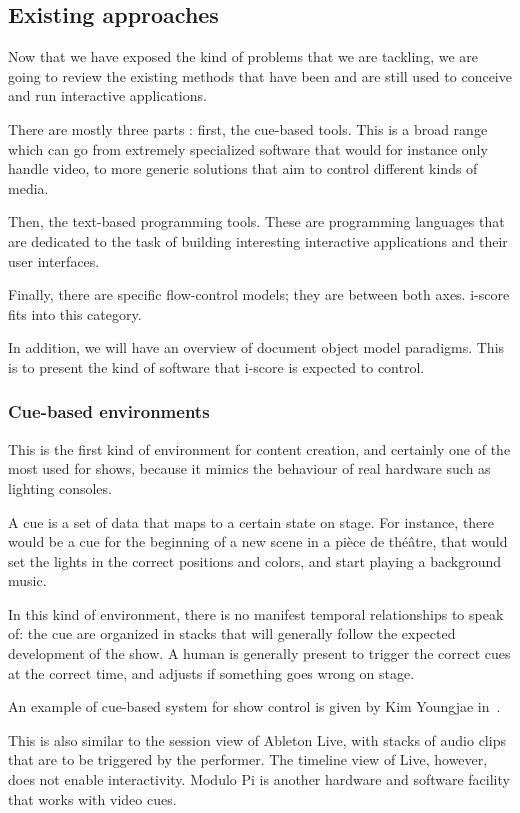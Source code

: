 \documentclass{sigchi}
\begin{document}
\subsection{Existing approaches}
Now that we have exposed the kind of problems that we are tackling, we are going to review the existing methods that have been and are still used to conceive and run interactive applications.

There are mostly three parts : first, the cue-based tools. This is a broad range which can go from extremely specialized software that would for instance only handle video, to more generic solutions that aim to control different kinds of media.

Then, the text-based programming tools. These are programming languages that are dedicated to the task of building interesting interactive applications and their user interfaces.

Finally, there are specific flow-control models; they are between both axes. i-score fits into this category.

In addition, we will have an overview of document object model paradigms. This is to present the kind of software that i-score is expected to control. %

\subsubsection{Cue-based environments}
This is the first kind of environment for content creation, and certainly one of the most used for shows, because it mimics the behaviour of real hardware such as lighting consoles.

A cue is a set of data that maps to a certain state on stage. For instance, there would be a cue for the beginning of a new scene in a pièce de théâtre, that would set the lights in the correct positions and colors, and start playing a background music.

In this kind of environment, there is no manifest temporal relationships to speak of: the cue are organized in stacks that will generally follow the expected development of the show. A human is generally present to trigger the correct cues at the correct time, and adjusts if something goes wrong on stage.

An example of cue-based system for show control is given by Kim Youngjae in~\cite{kim_unified_2013}. 

This is also similar to the session view of Ableton Live, with stacks of audio clips that are to be triggered by the performer. The timeline view of Live, however, does not enable interactivity. Modulo Pi is another hardware and software facility that works with video cues.
\end{document}
